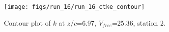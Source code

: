 \begin{figure}[H]
\centering
\texttt{[image: figs/run\_16/run\_16\_ctke\_contour]}
\caption{Contour plot of $k$ at $z/c$=6.97, $V_{free}$=25.36, station 2.}
\label{fig:run_16_ctke_contour}
\end{figure}


